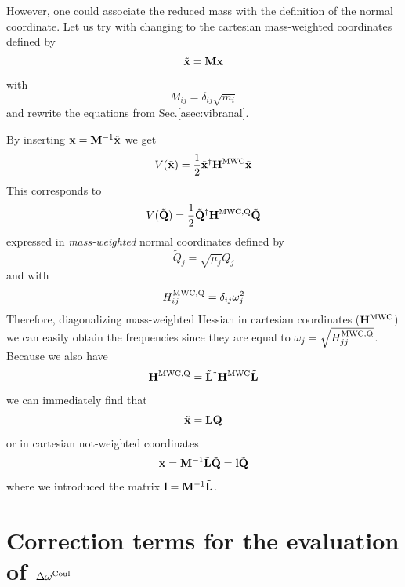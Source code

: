 \documentclass[a4paper,titlepage,twoside,fleqn,12pt]{book}
\begin{document}
\begin{appendices}
However, one could 
associate the reduced mass with the definition of the normal coordinate.
Let us try with changing to the cartesian mass\hyp{}weighted coordinates defined by
\begin{equation}
\tilde{\bf x} = {\bf M}{\bf x} 
\end{equation}
with
\begin{equation}
M_{ij} = \delta_{ij} \sqrt{m_i}
\end{equation}
and rewrite the equations from Sec.\ref{asec:vibranal}.

By inserting ${\bf x}={\bf M}^{-1}\tilde{\bf x}$ we get
\begin{equation}
V(\tilde{\bf x}) = \frac{1}{2} \tilde{\bf x}^{\dagger} {\bf H}^{\rm MWC}  \tilde{\bf x}
\end{equation}
This corresponds to 
\begin{equation}
V(\tilde{\bf Q}) = \frac{1}{2} \tilde{\bf Q}^{\dagger} {\bf H}^{\rm MWC,Q}  \tilde{\bf Q}
\end{equation}
expressed in \emph{mass-weighted} normal coordinates defined by
\begin{equation}
\tilde{Q}_j = \sqrt{\mu_j} Q_j
\end{equation}
and with 
\begin{equation}
H_{ij}^{\rm MWC,Q} = \delta_{ij} \omega_j^2
\end{equation}
Therefore, diagonalizing mass-weighted Hessian in cartesian coordinates (${\bf H}^{\rm MWC}$)
we can easily obtain the frequencies since they are equal to $\omega_j=\sqrt{H_{jj}^{\rm MWC,Q}}$.
Because we also have
\begin{equation}
{\bf H}^{\rm MWC,Q} = \tilde{\bf L}^{\dagger} {\bf H}^{\rm MWC} \tilde{\bf L}
\end{equation}
we can immediately find that
\begin{equation}
\tilde{\bf x} = \tilde{\bf L} \tilde{\bf Q}
\end{equation}
or in cartesian not-weighted coordinates
\begin{equation}
{\bf x} = {\bf M}^{-1} \tilde{\bf L} \tilde{\bf Q} = {\bf l} \tilde{\bf Q}
\end{equation}
where we introduced the matrix ${\bf l}={\bf M}^{-1} \tilde{\bf L}$.

\chapter{Correction terms for the evaluation of $\Delta \omega^{\rm Coul}$\label{a:fk-terms}}


\end{appendices}
\end{document}
